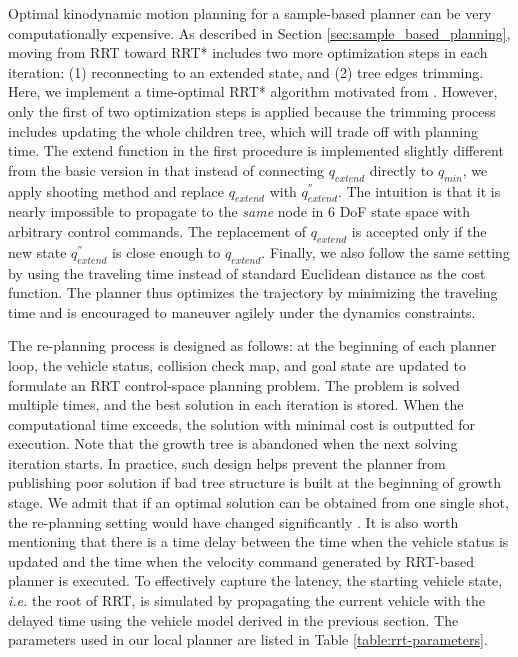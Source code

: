 \documentclass[../thesis.tex]{subfiles}
\begin{document}
Optimal kinodynamic motion planning for a sample-based planner can be very computationally expensive.
As described in Section \ref{sec:sample_based_planning}, moving from RRT toward RRT* includes two more optimization steps in each iteration: (1) reconnecting to an extended state, and (2) tree edges trimming.
Here, we implement a time-optimal RRT* algorithm motivated from \citet{hwan2011anytime}.
However, only the first of two optimization steps is applied because the trimming process includes updating the whole children tree, which will trade off with planning time.
The extend function in the first procedure is implemented slightly different from the basic version in that instead of connecting $q_{extend}$ directly to $q_{min}$, we apply shooting method and replace $q_{extend}$ with $q^{''}_{extend}$.
The intuition is that it is nearly impossible to propagate to the \textit{same} node in 6 DoF state space with arbitrary control commands.
The replacement of $q_{extend}$ is accepted only if the new state $q^{''}_{extend}$ is close enough to $q_{extend}$.
Finally, we also follow the same setting by using the traveling time instead of standard Euclidean distance as the cost function.
The planner thus optimizes the trajectory by minimizing the traveling time and is encouraged to maneuver agilely under the dynamics constraints.
 
The re-planning process is designed as follows: at the beginning of each planner loop, the vehicle status, collision check map, and goal state are updated to formulate an RRT control-space planning problem.
The problem is solved multiple times, and the best solution in each iteration is stored.
When the computational time exceeds, the solution with minimal cost is outputted for execution.
Note that the growth tree is abandoned when the next solving iteration starts.
In practice, such design helps prevent the planner from publishing poor solution if bad tree structure is built at the beginning of growth stage.
We admit that if an optimal solution can be obtained from one single shot, the re-planning setting would have changed significantly \cite{ferguson2006replanning}.
It is also worth mentioning that there is a time delay between the time when the vehicle status is updated and the time when the velocity command generated by RRT-based planner is executed.
To effectively capture the latency, the starting vehicle state, \textit{i.e.} the root of RRT, is simulated by propagating the current vehicle with the delayed time using the vehicle model derived in the previous section.
The parameters used in our local planner are listed in Table \ref{table:rrt-parameters}.
 
\end{document}
